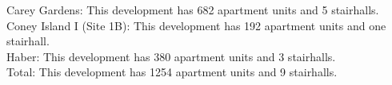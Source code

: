 {Carey Gardens}: This development has 682 apartment units and 5 stairhalls.\\{Coney Island I (Site 1B)}: This development has 192 apartment units and one stairhall.\\{Haber}: This development has 380 apartment units and 3 stairhalls.\\{Total}: This development has 1254 apartment units and 9 stairhalls.\\